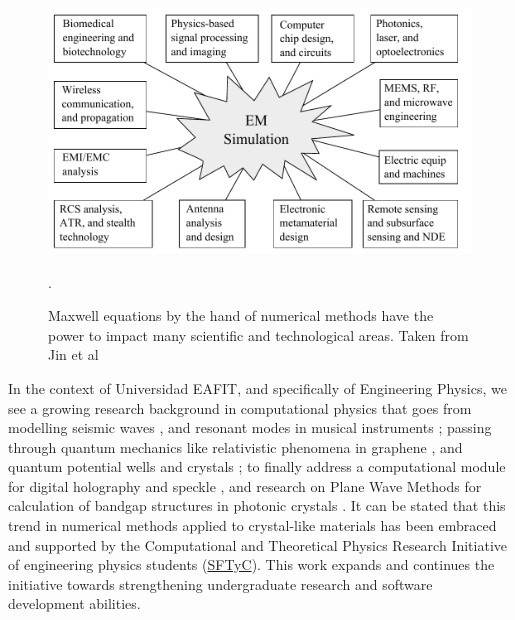 \begin{figure}[h]
\centering
\includegraphics[scale=0.5]{./img/EM_simulation_applications.pdf}
\caption{Maxwell equations by the hand of numerical methods have the power to impact many scientific and technological areas. Taken from Jin et al \cite{Jin2010}}.
\label{fig:simulation_areas}
\end{figure}

In the context of Universidad EAFIT, and specifically of Engineering Physics, we see a growing research background in computational physics that goes from modelling seismic waves \cite{Guarin2012}, and resonant modes in musical instruments \cite{Rodriguez2012}; passing through quantum mechanics like relativistic phenomena in graphene \cite{Villegas2011}, and quantum potential wells and crystals \cite{Echeverri2011}; to finally address a computational module for digital holography and speckle \cite{Sierra2010}, and research on Plane Wave Methods for calculation of bandgap structures in photonic crystals \cite{Loaiza2011}. It can be stated that this trend in numerical methods applied to crystal-like materials has been embraced and supported by the Computational and Theoretical Physics Research Initiative of engineering physics students (\href{https://sites.google.com/site/fisicatyc/home}{SFTyC}). This work expands and continues the initiative towards strengthening undergraduate research and software development abilities. 

\pagebreak